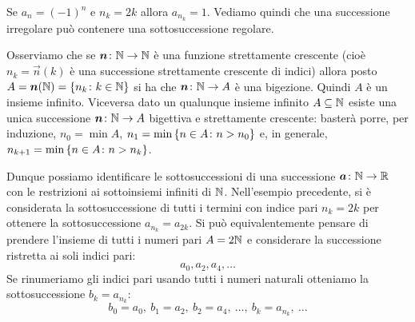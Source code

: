 \begin{example}
Se $a_n = (-1)^n$ e $n_k=2k$ allora $a_{n_k} = 1$.
Vediamo quindi che una successione irregolare
può contenere una sottosuccessione regolare.
\end{example}

Osserviamo che se $\boldsymbol n\colon \mathbb N\to \mathbb N$ è una
funzione strettamente crescente
(cioè $n_k=\vec n(k)$ è una successione strettamente crescente di indici)
allora posto $A=\boldsymbol n(\mathbb N)={\left\{ n_k\colon k\in \mathbb N \right\}}$ si ha che
$\boldsymbol n \colon \mathbb N \to A$ è una bigezione. Quindi $A$ è un insieme infinito.
Viceversa dato un qualunque insieme infinito $A\subseteq \mathbb N$ esiste una
unica successione $\boldsymbol n\colon \mathbb N \to A$ bigettiva e strettamente crescente:
basterà porre, per induzione,
$n_0 = \min A$, $n_1 = \min {\left\{ n\in A \colon n > n_0 \right\}}$
e, in generale,
 $n_{k+1} = \min{\left\{  n\in A \colon n > n_k \right\}}$.

Dunque possiamo identificare le sottosuccessioni di una successione
$\boldsymbol a \colon \mathbb N \to \mathbb R$ con le restrizioni ai sottoinsiemi infiniti di $\mathbb N$.
Nell'esempio precedente, si è considerata la sottosuccessione
di tutti i termini con indice pari $n_k=2k$ per ottenere la sottosuccessione
$a_{n_k} = a_{2k}$. Si può equivalentemente pensare di prendere l'insieme di
tutti i numeri pari $A=2\mathbb N$ e considerare la successione ristretta ai soli
indici pari:
\[
  a_0, a_2, a_4, \dots
\]
Se rinumeriamo gli indici pari usando tutti i numeri naturali otteniamo
la sottosuccessione $b_k=a_{n_k}$:
\[
  b_0 = a_0,\ b_1 = a_2,\ b_2 = a_4,\ \dots,\ b_k = a_{n_k},\ \dots
\]

